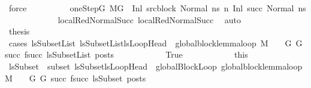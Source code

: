 \begin{isabellebody}
\ force\isanewline
\ \ \ \ \ \ \ \ \isamarkupfalse%
\ oneStepG{\isacharcolon}{\kern0pt}\ {\isachardoublequoteopen}M{\isacharcomma}{\kern0pt}{\isasymLambda}{\isacharcomma}{\kern0pt}{\isasymGamma}{\isacharcomma}{\kern0pt}{\isasymOmega}{\isacharcomma}{\kern0pt}G\ {\isasymturnstile}\ {\isacharparenleft}{\kern0pt}Inl\ src{\isacharunderscore}{\kern0pt}block{\isacharcomma}{\kern0pt}\ Normal\ ns{\isacharparenright}{\kern0pt}\ {\isacharminus}{\kern0pt}n{\isasymrightarrow}\ {\isacharparenleft}{\kern0pt}Inl\ succ{\isacharcomma}{\kern0pt}\ Normal\ ns{\isacharprime}{\kern0pt}{\isacharparenright}{\kern0pt}{\isachardoublequoteclose}\isanewline
\ \ \ \ \ \ \ \ \ \ \isamarkupfalse%
\ {\isachardoublequoteopen}{}{\isachardoublequoteclose}{\isacharparenleft}{\kern0pt}{}{\isacharparenright}{\kern0pt}\ local{\isachardot}{\kern0pt}RedNormalSucc{\isacharparenleft}{\kern0pt}{}{\isacharparenright}{\kern0pt}\ local{\isachardot}{\kern0pt}RedNormalSucc{\isacharparenleft}{\kern0pt}{}{\isacharparenright}{\kern0pt}\ \isamarkupfalse%
\ auto\isanewline
\ \ \ \ \ \ \ \ \isamarkupfalse%
\ \isamarkupfalse%
\ {\isacharquery}{\kern0pt}thesis\isanewline
\ \ \ \ \ \ \ \ \isamarkupfalse%
\ {\isacharparenleft}{\kern0pt}cases\ {\isachardoublequoteopen}{\isasymexists}lsSubsetList{\isachardot}{\kern0pt}\ lsSubsetList{\isasymsubseteq}lsLoopHead\ {\isasymand}\ global{\isacharunderscore}{\kern0pt}block{\isacharunderscore}{\kern0pt}lemma{\isacharunderscore}{\kern0pt}loop\ M\ {\isasymLambda}\ {\isasymGamma}\ {\isasymOmega}\ G\ G{\isacharprime}{\kern0pt}\ succ\ {\isacharparenleft}{\kern0pt}f{\isacharparenleft}{\kern0pt}succ{\isacharparenright}{\kern0pt}{\isacharparenright}{\kern0pt}\ lsSubsetList\ posts{\isachardoublequoteclose}{\isacharparenright}{\kern0pt}\isanewline
\ \ \ \ \ \ \ \ \ \ \isamarkupfalse%
\ True\isanewline
\ \ \ \ \ \ \ \ \ \ \isamarkupfalse%
\ this\ \isamarkupfalse%
\ lsSubset\ \ subset{\isacharcolon}{\kern0pt}\ {\isachardoublequoteopen}lsSubset{\isasymsubseteq}lsLoopHead{\isachardoublequoteclose}\ \ globalBlockLoop{\isacharcolon}{\kern0pt}\ {\isachardoublequoteopen}global{\isacharunderscore}{\kern0pt}block{\isacharunderscore}{\kern0pt}lemma{\isacharunderscore}{\kern0pt}loop\ M\ {\isasymLambda}\ {\isasymGamma}\ {\isasymOmega}\ G\ G{\isacharprime}{\kern0pt}\ succ\ {\isacharparenleft}{\kern0pt}f{\isacharparenleft}{\kern0pt}succ{\isacharparenright}{\kern0pt}{\isacharparenright}{\kern0pt}\ lsSubset\ posts{\isachardoublequoteclose}\isanewline

\end{isabellebody}
